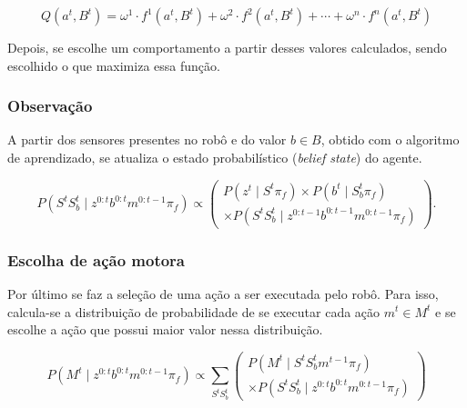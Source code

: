 \begin{equation} \label{equation:QLearningEscolhaComportamentoFinal}
    	Q \left( a^t, B^t \right) = \omega^1 \cdot f^1 \left( a^t, B^t \right) + \omega^2 \cdot f^2 \left( a^t, B^t \right) + \cdots + \omega^n \cdot f^n \left( a^t, B^t \right)
\end{equation}

Depois, se escolhe um comportamento a partir desses valores calculados, sendo escolhido o que maximiza essa função.


\subsubsection{Observação}

A partir dos sensores presentes no robô e do valor $ b \in B $, obtido com o algoritmo de aprendizado, se atualiza o estado probabilístico (\textit{belief state}) do agente.

\begin{equation}
    P \left( S^t S_b^t \mid z^{0: t} b^{0: t} m^{0: t-1} \pi_f \right) \propto
        \left(
            \begin{array}{l}
                P \left( z^t \mid S^t \pi_f \right) \times P \left( b^t \mid S_b^t \pi_f \right) \\
                \times P \left( S^t S_b^t \mid z^{0: t-1} b^{0: t-1} m^{0: t-1} \pi_f \right)
            \end{array}
        \right).
\end{equation}


\subsubsection{Escolha de ação motora}

Por último se faz a seleção de uma ação a ser executada pelo robô. Para isso, calcula-se a distribuição de probabilidade de se executar cada ação $ m^t \in M^t $ e se escolhe a ação que possui maior valor nessa distribuição.

\begin{equation}
    P \left( M^t \mid z^{0: t} b^{0: t} m^{0: t-1} \pi_f \right) \propto \sum\limits_{S^t S_b^t}
        \left(
            \begin{array}{l}
                P \left( M^t \mid S^t S_b^t m^{t-1} \pi_f \right)\\
                \times P \left( S^t S_b^t \mid z^{0: t} b^{0: t} m^{0: t-1} \pi_f \right)
            \end{array}
        \right)
\end{equation}


